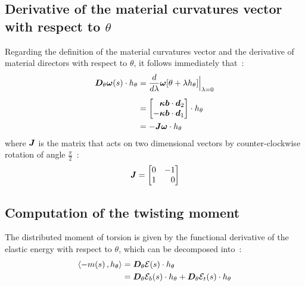 \subsection{Derivative of the material curvatures vector with respect to $\theta$}
Regarding the definition of the material curvatures vector and the derivative of material directors with respect to $\theta$, it follows immediately that~:
\begin{equation}
\begin{aligned}
	\pdiffof{\theta}{\vect{\omega}}{s}{h_\theta}
	&= \frac{d}{d\lambda} \vect{\omega}[\theta + \lambda h_\theta]\Bigr|_{\lambda = 0} 
	\\[0.5em]
	&= \begin{bmatrix*}[r]
		\vect{\kappa b}\cdot\vect{d}_2\\
		-\vect{\kappa b}\cdot\vect{d}_1\\
	\end{bmatrix*}\cdot h_\theta \\
	&= - \mat{J}\vect{\omega}\cdot h_\theta
\end{aligned}
\label{eq:DthetaW}
\end{equation}
where $\boldsymbol{\mathit{J}}$ is the matrix that acts on two dimensional vectors by counter-clockwise rotation of angle $\frac{\pi}{2}$~:
\begin{equation}
	\mat{J} = \begin{bmatrix*}[r]
			0	&	-1\\
			1	&	0\\
		\end{bmatrix*}
\end{equation}

\subsection{Computation of the twisting moment}

The distributed moment of torsion is given by the functional derivative of the elastic energy with respect to $\theta$, which can be decomposed into~:
\begin{equation}
	\begin{aligned}
	\langle -m(s)\,, h_\theta\rangle 
	&= \boldsymbol{D}_\theta\mathcal{E}(s)\cdot h_\theta \\
	&= \boldsymbol{D}_\theta\mathcal{E}_b(s)\cdot h_\theta + \boldsymbol{D}_\theta\mathcal{E}_t(s)\cdot h_\theta
	\end{aligned}
\label{eq:mintdef}
\end{equation}

